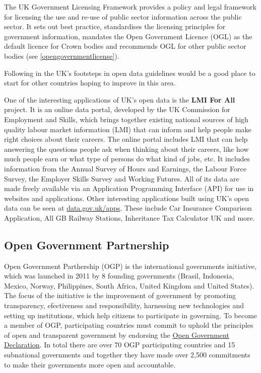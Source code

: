 \documentclass[thesis=B,english]{FITthesis}[2012/06/26]
\begin{document}
The UK Government Licensing Framework provides a policy and legal framework for licensing the use and re-use of public sector information across the public sector. It sets out best practice, standardises the licensing principles for government information, mandates the Open Government Licence (OGL) as the default licence for Crown bodies and recommends OGL for other public sector bodies (see \ref{opengovernmentlicense}).

Following in the UK’s footsteps in open data guidelines would be a good place to start for other countries hoping to improve in this area.\cite{UKopendatagov}

One of the interesting applications of UK's open data is the \textbf{LMI For All} project. It is an online data portal, developed by the UK Commission for Employment and Skills, which brings together existing national sources of high quality labour market information (LMI) that can inform and help people make right choices about their careers. The online portal includes LMI that can help answering the questions people ask when thinking about their careers, like how much people earn or what type of persons do what kind of jobs, etc. It includes information from the Annual Survey of Hours and Earnings, the Labour Force Survey, the Employer Skills Survey and Working Futures. All of its data are made freely available  via an Application Programming Interface (API) for use in websites and applications. \linebreak
Other interesting applications built using UK's open data can be seen at \href{https://data.gov.uk/apps}{data.gov.uk/apps}. These include Car Insurance Comparison Application, All GB Railway Stations, Inheritance Tax Calculator UK and more.


	\subsection{Open Government Partnership}
	Open Government Parthership (OGP) is the international governments initiative, which was launched in 2011 by 8 founding governments (Brasil, Indonesia, Mexico, Norway, Philippines, South Africa, United Kingdom and United States). The focus of the initiative is the improvement of government by promoting transparency, efectiveness and responsibility, harnessing new technologies and setting up institutions, which help citizens to participate in governing. To become a member of OGP, participating countries must commit to uphold the principles of open and transparent government by endorsing the \href{https://www.opengovpartnership.org/open-government-declaration}{Open Government Declaration}. In total there are over 70 OGP participating countries and 15 subnational governments and together they have made over 2,500 commitments to make their governments more open and accountable. \cite{opengovernmentpartnership}
	
\end{document}
